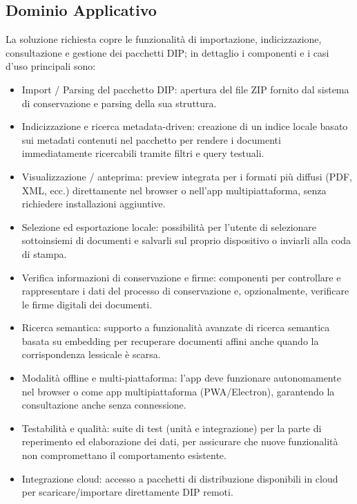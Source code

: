 \documentclass[a4paper,12pt]{article}
\begin{document}
    \subsection{Dominio Applicativo}
    La soluzione richiesta copre le funzionalità di importazione, indicizzazione, consultazione e gestione dei pacchetti DIP; in dettaglio i componenti e i casi d’uso principali sono:
    \begin{itemize}
        \item Import / Parsing del pacchetto DIP: apertura del file ZIP fornito dal sistema di conservazione e parsing della sua struttura. 
        \item Indicizzazione e ricerca metadata-driven: creazione di un indice locale basato sui metadati contenuti nel pacchetto per rendere i documenti immediatamente ricercabili tramite filtri e query testuali. 
        \item Visualizzazione / anteprima: preview integrata per i formati più diffusi (PDF, XML, ecc.) direttamente nel browser o nell’app multipiattaforma, senza richiedere installazioni aggiuntive. 
        \item Selezione ed esportazione locale: possibilità per l’utente di selezionare sottoinsiemi di documenti e salvarli sul proprio dispositivo o inviarli alla coda di stampa. 
        \item Verifica informazioni di conservazione e firme: componenti per controllare e rappresentare i dati del processo di conservazione e, opzionalmente, verificare le firme digitali dei documenti. 
        \item Ricerca semantica: supporto a funzionalità avanzate di ricerca semantica basata su embedding per recuperare documenti affini anche quando la corrispondenza lessicale è scarsa. 
        \item Modalità offline e multi-piattaforma: l’app deve funzionare autonomamente nel browser o come app multipiattaforma (PWA/Electron), garantendo la consultazione anche senza connessione. 
        \item Testabilità e qualità: suite di test (unità e integrazione) per la parte di reperimento ed elaborazione dei dati, per assicurare che nuove funzionalità non compromettano il comportamento esistente. 
        \item Integrazione cloud: accesso a pacchetti di distribuzione disponibili in cloud per scaricare/importare direttamente DIP remoti.
    \end{itemize}
\end{document}
